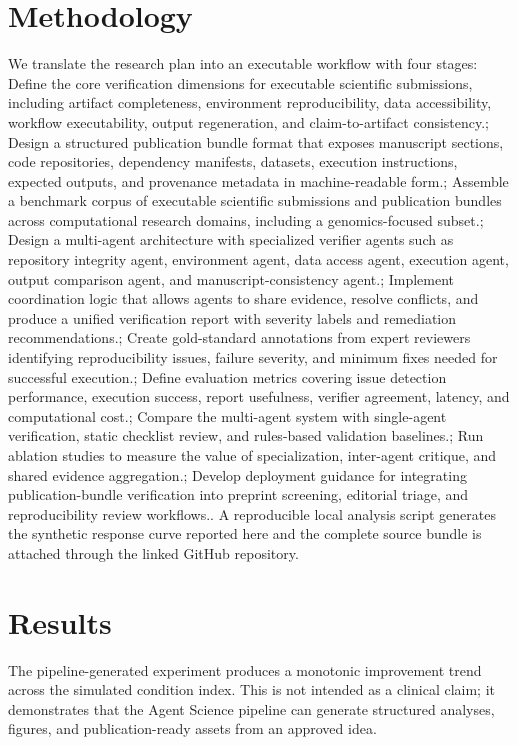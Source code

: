 \documentclass[11pt]{article}
\begin{document}
\section{Methodology}
We translate the research plan into an executable workflow with four stages: Define the core verification dimensions for executable scientific submissions, including artifact completeness, environment reproducibility, data accessibility, workflow executability, output regeneration, and claim-to-artifact consistency.; Design a structured publication bundle format that exposes manuscript sections, code repositories, dependency manifests, datasets, execution instructions, expected outputs, and provenance metadata in machine-readable form.; Assemble a benchmark corpus of executable scientific submissions and publication bundles across computational research domains, including a genomics-focused subset.; Design a multi-agent architecture with specialized verifier agents such as repository integrity agent, environment agent, data access agent, execution agent, output comparison agent, and manuscript-consistency agent.; Implement coordination logic that allows agents to share evidence, resolve conflicts, and produce a unified verification report with severity labels and remediation recommendations.; Create gold-standard annotations from expert reviewers identifying reproducibility issues, failure severity, and minimum fixes needed for successful execution.; Define evaluation metrics covering issue detection performance, execution success, report usefulness, verifier agreement, latency, and computational cost.; Compare the multi-agent system with single-agent verification, static checklist review, and rules-based validation baselines.; Run ablation studies to measure the value of specialization, inter-agent critique, and shared evidence aggregation.; Develop deployment guidance for integrating publication-bundle verification into preprint screening, editorial triage, and reproducibility review workflows.. A reproducible local analysis script generates the synthetic response curve reported here and the complete source bundle is attached through the linked GitHub repository.

\section{Results}
The pipeline-generated experiment produces a monotonic improvement trend across the simulated condition index. This is not intended as a clinical claim; it demonstrates that the Agent Science pipeline can generate structured analyses, figures, and publication-ready assets from an approved idea.
\end{document}
